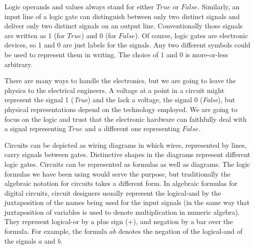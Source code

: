 Logic operands and values always stand for either $True$ or $False$.
Similarly, an input line of a logic gate can distinguish between
only two distinct signals and deliver only two distinct
signals
on an output line.
Conventionally those signals are written as 1 (for $True$) and 0 (for $False$).
Of course, logic gates are electronic devices,
so 1 and 0 are just labels for the signals.
Any two different symbols could be used to represent them in writing.
The choice of 1 and 0 is more-or-less arbitrary.

There are many ways to handle the electronics,
but we are going to leave the physics to the electrical engineers.
A voltage at a point in a circuit might represent
the signal 1 (\emph{True})
and the lack a voltage, the signal 0 (\emph{False}),
but physical representations depend on the technology employed.
We are going to focus on the logic and trust that
the electronic hardware can faithfully deal with
a signal representing $True$ and a different one representing $False$.

Circuits
can be depicted as wiring diagrams
in which wires, represented by lines, carry signals between gates.
Distinctive shapes in the diagrams represent different logic gates.
Circuits can be represented as formulas as well as diagrams.
The logic formulas we have been using would serve the purpose,
but traditionally the algebraic notation for circuits takes a
different form.
In algebraic formulas for digital circuits, circuit designers usually
represent the logical-and by the juxtaposition
of the names being used for the input signals (in the same way
that juxtaposition of variables is used to denote multiplication
in numeric algebra).
They represent logical-or by a plus sign ($+$),
and negation by a bar over the formula.
For example, the formula $\overline{ab}$ denotes the negation of the logical-and
of the signals $a$ and $b$.

